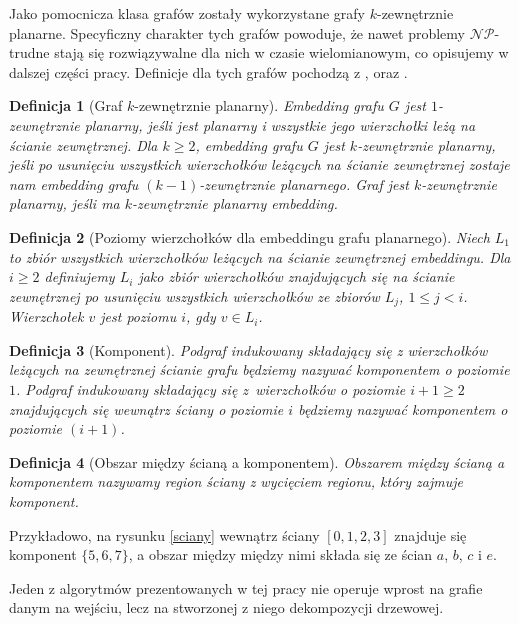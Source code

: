\documentclass[twoside,a4paper,12pt]{report} %
\theoremstyle{break}
\newtheorem{definition}{Definicja}[section]
\begin{document}
Jako pomocnicza klasa grafów zostały wykorzystane grafy $k$-zewnętrznie planarne. Specyficzny charakter tych grafów powoduje, że nawet problemy $\mathcal{NP}$-trudne stają się rozwiązywalne dla nich w czasie wielomianowym, co opisujemy w dalszej części pracy. Definicje dla tych grafów pochodzą z \cite{ioannis}, \cite{baker} oraz \cite{dominating}.

\begin{definition}[Graf $k$-zewnętrznie planarny]
Embedding grafu $G$ jest \emph{$1$-zewnętrznie planarny}, jeśli jest planarny i wszystkie jego wierzchołki leżą na ścianie zewnętrznej. Dla $k \ge 2$, embedding grafu $G$ jest \emph{$k$-zewnętrznie planarny}, jeśli po usunięciu wszystkich wierzchołków leżących na ścianie zewnętrznej zostaje nam embedding grafu $(k-1)$-zewnętrznie planarnego. Graf jest \emph{$k$-zewnętrznie planarny}, jeśli ma $k$-zewnętrznie planarny embedding.
\end{definition}

\begin{definition}[Poziomy wierzchołków dla embeddingu grafu planarnego]
Niech $L_1$ to zbiór wszystkich wierzchołków leżących na ścianie zewnętrznej embeddingu. Dla $i \ge 2$ definiujemy $L_i$ jako zbiór wierzchołków znajdujących się na ścianie zewnętrznej po usunięciu wszystkich wierzchołków ze zbiorów $L_j$, $1 \le j < i$. Wierzchołek $v$ jest poziomu $i$, gdy $v \in L_i$.
\end{definition}

\begin{definition}[Komponent]
Podgraf indukowany składający się z wierzchołków leżących na zewnętrznej ścianie grafu będziemy nazywać \emph{komponentem o poziomie $1$}. Podgraf indukowany składający się z~wierzchołków o poziomie $i+1 \ge 2$ znajdujących się wewnątrz ściany o poziomie $i$ będziemy nazywać \emph{komponentem o poziomie $(i+1)$}.
\end{definition}

\begin{definition}[Obszar między ścianą a komponentem]
Obszarem między ścianą a komponentem nazywamy region ściany z wycięciem regionu, który zajmuje komponent.
\end{definition}

Przykładowo, na rysunku \ref{sciany} wewnątrz ściany $[0,1,2,3]$ znajduje się komponent $\{5,6,7\}$, a obszar między między nimi składa się ze ścian $a$, $b$, $c$ i $e$.

Jeden z algorytmów prezentowanych w tej pracy nie operuje wprost na grafie danym na wejściu, lecz na stworzonej z niego dekompozycji drzewowej.
\end{document}
